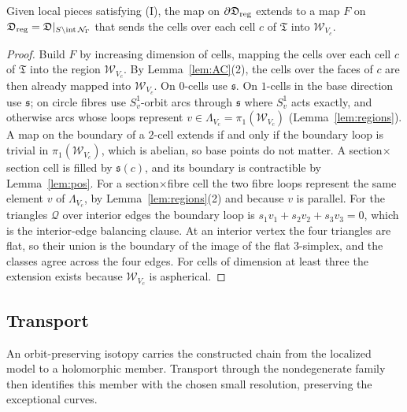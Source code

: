 \begin{lemma}[extension]\label{lem:ext}
Given local pieces satisfying (I), the map on $\partial\mathfrak D_{\rm reg}$ extends to a map $F$ on
$\mathfrak D_{\rm reg}=\mathfrak D|_{S\setminus\operatorname{int}\mathcal N_\Gamma}$ that sends the cells over each cell $c$ of
$\mathfrak T$ into $\mathscr W_{V_c}$.
\end{lemma}
\begin{proof}
Build $F$ by increasing dimension of cells, mapping the cells over each cell $c$ of $\mathfrak T$ into the region $\mathscr W_{V_c}$. By
Lemma~\ref{lem:AC}(2), the cells over the faces of $c$ are then already mapped into $\mathscr W_{V_c}$. On $0$-cells use $\mathfrak s$. On
$1$-cells in the base direction use $\mathfrak s$; on circle fibres use $S^1_v$-orbit arcs through $\mathfrak s$ where $S^1_v$ acts
exactly, and otherwise arcs whose loops represent $v\in\Lambda_{V_c}=\pi_1(\mathscr W_{V_c})$ (Lemma~\ref{lem:regions}). A map on the
boundary of a $2$-cell extends if and only if the boundary loop is trivial in $\pi_1(\mathscr W_{V_c})$, which is abelian, so base points
do not matter. A section$\times$section cell is filled by $\mathfrak s(c)$, and its boundary is contractible by
Lemma~\ref{lem:pos}. For a section$\times$fibre cell the two fibre loops represent the same element $v$ of $\Lambda_{V_c}$, by
Lemma~\ref{lem:regions}(2) and because $v$ is parallel. For the triangles $\mathcal Q$ over interior edges the boundary loop is
$s_1v_1+s_2v_2+s_3v_3=0$, which is the interior-edge balancing clause. At an interior vertex the four triangles are flat, so their union is the boundary
of the image of the flat $3$-simplex, and the classes agree across the four edges. For cells of dimension at least three the
extension exists because $\mathscr W_{V_c}$ is aspherical.
\end{proof}

\subsection{Transport}\label{ssec:res-transport}
An orbit-preserving isotopy carries the constructed chain from the localized model to a holomorphic member.
Transport through the nondegenerate family then identifies this member with the chosen small resolution, preserving the exceptional curves.

